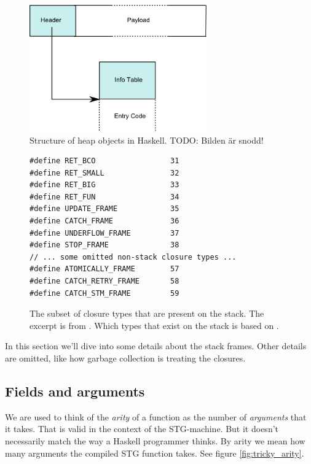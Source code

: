 \begin{figure}
  \centering
  \includegraphics[width=3.0in]{fig/heap-object}
  \caption{Structure of heap objects in Haskell. TODO: Bilden är snodd!}
  \label{fig:heap_object}
\end{figure}

\begin{figure}
\begin{mdframed}
  \begin{verbatim}
#define RET_BCO                 31
#define RET_SMALL               32
#define RET_BIG                 33
#define RET_FUN                 34
#define UPDATE_FRAME            35
#define CATCH_FRAME             36
#define UNDERFLOW_FRAME         37
#define STOP_FRAME              38
// ... some omitted non-stack closure types ...
#define ATOMICALLY_FRAME        57
#define CATCH_RETRY_FRAME       58
#define CATCH_STM_FRAME         59
  \end{verbatim}
  \caption{The subset of closure types that are present on the stack.
The excerpt is from \cite{github_closure_types}. Which types that exist
on the stack is based on \cite{github_scavenge_stack}.}
  \label{fig:stack_types}
\end{mdframed}
\end{figure}


In this section we'll dive into
some details about the stack frames. Other details
are omitted, like how garbage collection is treating the closures.

\subsection{Fields and arguments}

We are used to think of the \emph{arity} of a function as the number
of \emph{arguments} that it takes. That is valid in the context of the
STG-machine. But it doesn't necessarily match the way a Haskell
programmer thinks. By arity we mean how many arguments the compiled
STG function takes. See figure \ref{fig:tricky_arity}. \cite{commentary_function_calls}

